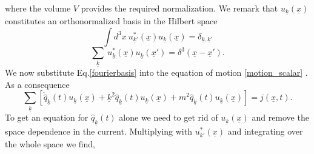 \documentclass[12pt, titlepage]{article}
\begin{document}
where the volume $ V $ provides the required normalization. We remark that $ u_{\underline{k}}(\underline{x}) $ constitutes an orthonormalized basis in the Hilbert space
\begin{equation}\label{ortho_relation}
\int d^{3}x \ 
u^{\ast}_{\underline{k}'}(\underline{x})
u_{\underline{k}}(\underline{x})
=
\delta_{\underline{k}, \underline{k}'}
\end{equation}
\begin{equation}\label{completness_relation}
\sum_{\underline{k}} \ 
u^{\ast}_{\underline{k}}(\underline{x})
u_{\underline{k}}(\underline{x}')
=
\delta^{3}\left(\underline{x}-\underline{x}'\right)
.
\end{equation}
We now substitute Eq.\enskip\eqref{fourierbasis} into the equation of motion \eqref{motion_scalar}
. As a consequence  
\begin{equation}
 \sum_{\underline{k}}
 \left[ 
	\ddot{\hat{q}}_{\underline{k}}(t)u_{\underline{k}}(\underline{x})
	+\underline{k}^{2}\hat{q}_{\underline{k}}(t)u_{\underline{k}}(\underline{x})
	+m^{2}\hat{q}_{\underline{k}}(t)u_{\underline{k}}(\underline{x})
 \right] 
  =j(\underline{x},t).
\end{equation}
To get an equation for $ \hat{q}_{\underline{k}}(t) $ alone we need to get rid of $ u_{\underline{k}}(\underline{x}) $ and remove the space dependence in the current. Multiplying with $ u^{\ast}_{\underline{k}'}(\underline{x}) $ and integrating over the whole space we find,
\end{document}
